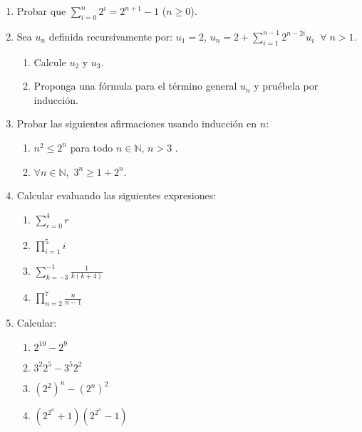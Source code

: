\documentclass[12pt,spanish,makeidx]{amsbook}
\begin{document}
\begin{enumerate}
\smallskip

\item Probar que $\sum_{i=0}^n 2^i = 2^{n+1} -1$ ($n \ge 0$). 


\smallskip

\item Sea $u_n$ definida recursivamente por: $u_1=2$, $u_n=2+\sum_{i=1}^{n-1}2^{n-2i}u_i \;\;\forall\; n >1$.
\begin{enumerate}
 \item Calcule $u_2$ y $u_3$.
 \item Proponga una fórmula para el término general $u_n$ y pruébela por inducción.
\end{enumerate}


\smallskip

\item Probar las siguientes afirmaciones usando inducción en $n$:
\begin{enumerate}
\item $n^2\leq 2^n$ para todo $n\in{\mathbb N}$, $n>3$ .
\item $\forall n \in {\mathbb N}$,\ $3^n \ge 1 + 2^n$.
\end{enumerate}

\smallskip


\item Calcular evaluando las siguientes expresiones:
\begin{multicols}{4}
 \begin{enumerate}
\item \quad $\displaystyle{\sum_{r=0}^4 r}$
\item \quad $\displaystyle{\prod_{i=1}^5 i}$
\item  \quad $\displaystyle{\sum_{k=-3}^{-1} \frac{1}{k(k+4)}}$
\item \quad $\displaystyle{\prod_{n=2}^7 \frac{n}{n-1}}$
\end{enumerate}
\end{multicols}




\smallskip

\item Calcular:
\begin{multicols}{2}
 \begin{enumerate}
\item \quad $2^{10} - 2^{9}$
\item \quad $3^2 2^5 - 3^5 2^2$
\item \quad $(2^2)^n - (2^n)^2$
\item \quad $(2^{2^n} + 1)  (2^{2^n} - 1)$
\end{enumerate}
\end{multicols}





\end{enumerate}
\end{document}
